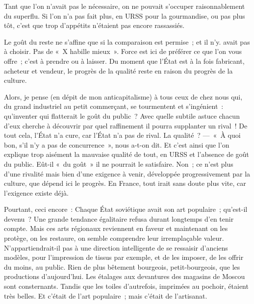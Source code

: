 \documentclass[french,twoside]{book} %
\newcommand{\astermono}{\medskip\centerline{\color{rubric}\large\selectfont{\syms ✻}}\medskip\par}%
\begin{document}
\noindent Tant que l’on n’avait pas le nécessaire, on ne pouvait s’occuper raisonnablement du superflu. Si l’on n’a pas fait plus, en URSS pour la gourmandise, ou pas plus tôt, c’est que trop d’appétits n’étaient pas encore rassassiés.\par
Le goût du reste ne s’affine que si la comparaison est permise ; et il n’y. avait pas à choisir. Pas de « X habille mieux ». Force est ici de préférer ce que l’on vous offre ; c’est à prendre ou à laisser. Du moment que l’État est à la fois fabricant, acheteur et vendeur, le progrès de la qualité reste en raison du progrès de la culture.\par
Alors, je pense (en dépit de mon anticapitalisme) à tous ceux de chez nous qui, du grand industriel au petit commerçant, se tourmentent et s’ingénient : qu’inventer qui flatterait le goût du public ? Avec quelle subtile astuce chacun d’eux cherche à découvrir par quel raffinement il pourra supplanter un rival ! De tout cela, l’État n’a cure, car l’État n’a pas de rival. La qualité ? — « À quoi bon, s’il n’y a pas de concurrence », nous a-t-on dit. Et c’est ainsi que l’on explique trop aisément la mauvaise qualité de tout, en URSS et l’absence de goût du public. Eût-il « du goût » il ne pourrait le satisfaire. Non ; ce n’est plus d’une rivalité mais bien d’une exigence à venir, développée progressivement par la culture, que dépend ici le progrès. En France, tout irait sans doute plus vite, car l’exigence existe déjà.\par
Pourtant, ceci encore : Chaque État soviétique avait son art populaire ; qu’est-il devenu ? Une grande tendance égalitaire refusa durant longtemps d’en tenir compte. Mais ces arts régionaux reviennent en faveur et maintenant on les protège, on les restaure, on semble comprendre leur irremplaçable valeur. N’appartiendrait-il pas à une direction intelligente de se ressaisir d’anciens modèles, pour l’impression de tissus par exemple, et de les imposer, de les offrir du moins, au public. Rien de plus bêtement bourgeois, petit-bourgeois, que les productions d’aujourd’hui. Les étalages aux devantures des magasins de Moscou sont consternants. Tandis que les toiles d’autrefois, imprimées au pochoir, étaient très belles. Et c’était de l’art populaire ; mais c’était de l’artisanat.\par

\astermono
\end{document}
